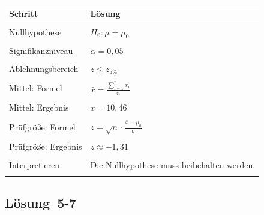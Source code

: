 \documentclass[
  11pt,
  ngerman,
  a4paper,
]{report}
\begin{document}
\begin{table}[H]
\centering
\begin{tabular}{l>{\raggedright\arraybackslash}p{8cm}}
\toprule
\textbf{Schritt} & \textbf{Lösung}\\
\midrule
\cellcolor{gray!6}{Test wählen} & \cellcolor{gray!6}{Varianz bekannt, deshalb $z$-Test}\\
Nullhypothese & $H_0: \mu = \mu_0$\\
\cellcolor{gray!6}{Alternativhypothese} & \cellcolor{gray!6}{$H_0: \mu < \mu_0$}\\
Signifikanzniveau & $\alpha = 0{,}05$\\
\cellcolor{gray!6}{Ablehnungsbereich} & \cellcolor{gray!6}{$z \leq z_{\alpha}$}\\
Ablehnungsbereich & $z \leq z_{5\%}$\\
\cellcolor{gray!6}{Ablehnungsbereich} & \cellcolor{gray!6}{$z \leq -1{,}65$}\\
Mittel: Formel & $\bar{x}=\frac{\sum\limits_{i=1}^{n}x_{i}}{n}$\\
\cellcolor{gray!6}{Mittel: Einsetzen} & \cellcolor{gray!6}{$\bar{x}=\frac{52{,}28}{5}$}\\
Mittel: Ergebnis & $\bar{x}=10{,}46$\\
\cellcolor{gray!6}{Standardabweichung} & \cellcolor{gray!6}{$\sigma=\sqrt{\sigma^2}\approx\sqrt{5{,}2}\approx2{,}28$}\\
Prüfgröße: Formel & $z=\sqrt{n}\cdot\frac{\bar{x}-\mu_0}{\sigma}$\\
\cellcolor{gray!6}{Prüfgröße: Einsetzen} & \cellcolor{gray!6}{$z=\sqrt{5}\cdot\frac{10{,}46-11{,}8}{2{,}28}$}\\
Prüfgröße: Ergebnis & $z\approx-1{,}31$\\
\cellcolor{gray!6}{Interpretieren} & \cellcolor{gray!6}{Der Ablehnungsbereich wurde nicht erreicht.}\\
Interpretieren & Die Nullhypothese muss beibehalten werden.\\
\cellcolor{gray!6}{Interpretieren} & \cellcolor{gray!6}{Die Behauptung, im Neubaugebiet seien die Mietpreise günstiger, konnte nicht bestätigt werden.}\\
\bottomrule
\end{tabular}
\end{table}

\hypertarget{loesung-5-7}{%
\subsection{Lösung~5-7}\label{loesung-5-7}}
\end{document}
